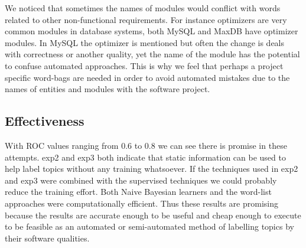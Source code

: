 \documentclass{acm_proc_article-sp}
\begin{document}
We noticed that sometimes the names of modules would conflict with words related to other non-functional requirements. For instance optimizers are very common modules in database systems, both MySQL and MaxDB have optimizer modules. In MySQL the optimizer is mentioned but often the change is deals with correctness or another quality, yet the name of the module has the potential to confuse automated approaches. This is why we feel that perhaps a project specific word-bags are needed in order to avoid automated mistakes due to the names of entities and modules with the software project.

\subsection{Effectiveness}


With ROC values ranging from $0.6$ to $0.8$ we can see there is promise in these attempts. \textsf{exp2} and \textsf{exp3} both indicate that static information can be used to help label topics without any training whatsoever. If the techniques used in \textsf{exp2} and \textsf{exp3} were combined with the supervised techniques we could probably reduce the training effort. 
Both Naive Bayesian learners and the word-list approaches were computationally efficient. Thus these results are promising because the results are accurate enough to be useful and cheap enough to execute to be feasible as an automated or semi-automated method of labelling topics by their software qualities.
\end{document}
